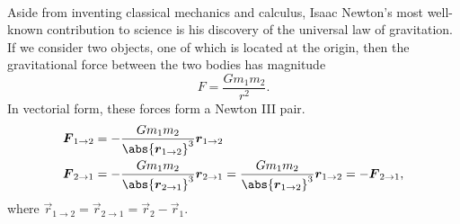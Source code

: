 \documentclass[../classical_mechanics.tex]{subfiles}
\begin{document}
        \paragraph{}
        Aside from inventing classical mechanics and calculus, Isaac Newton's most well-known contribution to science is his discovery of the universal law of gravitation.
        If we consider two objects, one of which is located at the origin, then the gravitational force between the two bodies has magnitude
        \begin{equation}
            F=\frac{Gm_1m_2}{r^2}.
        \end{equation}
        In vectorial form, these forces form a Newton III pair.
        \begin{align}
            \vec{F}_{1\to2}&=-\frac{Gm_1m_2}{\abs{\vec{r}_{1\to2}}^3}\vec{r}_{1\to2}\\
            \vec{F}_{2\to1}&=-\frac{Gm_1m_2}{\abs{\vec{r}_{2\to1}}^3}\vec{r}_{2\to1}=\frac{Gm_1m_2}{\abs{\vec{r}_{1\to2}}^3}\vec{r}_{1\to2}=-\vec{F}_{2\to1},
        \end{align}
        where $\vec{r}_{1\to2}=\vec{r}_{2\to1}=\vec{r}_2-\vec{r}_1$.
        
\end{document}
